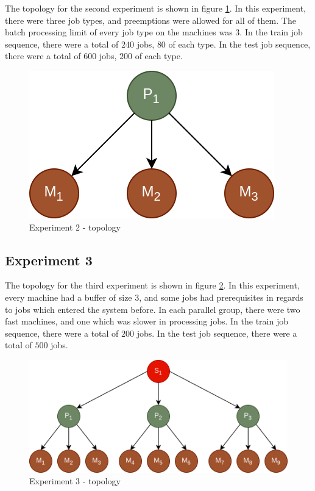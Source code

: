 The topology for the second experiment is shown in figure \ref{fig:experiment2_topology}. In this experiment, there were three job types, and preemptions were allowed for all of them. The batch processing limit of every job type on the machines was $3$. In the train job sequence, there were a total of $240$ jobs, $80$ of each type. In the test job sequence, there were a total of $600$ jobs, $200$ of each type.

\begin{figure}[!htbp]
	\centering
	\includegraphics[scale=0.3]{../images/experiment2_topology.png}
	\caption{Experiment 2 - topology}
    \label{fig:experiment2_topology}
\end{figure}

\subsection{Experiment 3}

The topology for the third experiment is shown in figure \ref{fig:experiment3_topology}. In this experiment, every machine had a buffer of size $3$, and some jobs had prerequisites in regards to jobs which entered the system before. In each parallel group, there were two fast machines, and one which was slower in processing jobs. In the train job sequence, there were a total of $200$ jobs. In the test job sequence, there were a total of $500$ jobs.

\begin{figure}[!htbp]
	\centering
	\includegraphics[scale=0.3]{../images/experiment3_topology.png}
	\caption{Experiment 3 - topology}
    \label{fig:experiment3_topology}
\end{figure}

